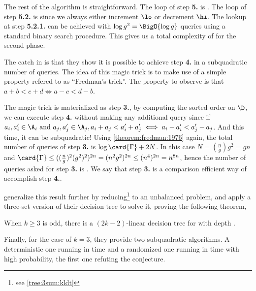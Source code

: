 The rest of the algorithm is straightforward. The loop of step \textbf{5.} is
. The loop of step \textbf{5.2.} is  since we
always either increment $\lo$ or decrement $\hi$. The lookup at step
\textbf{5.2.1.} can be achieved with $\log g^2 = \BigO{\log g}$ queries using
a standard binary search procedure. This gives us a total complexity of
 for the second phase.

The catch in \cite{gronlund:2014} is that they show it is possible to
achieve step \textbf{4.} in a subquadratic number of queries. The idea of this
magic trick is to make use of a simple property refered to as ``Fredman's
trick''. The property to observe is that $a + b < c + d \iff a - c < d - b$.

The magic trick is materialized as step \textbf{3.}, by computing the sorted
order on $\D$, we can execute step \textbf{4.} without making any additional
query since if $a_i, a_i' \in \A_i \text{ and } a_j, a_j' \in \A_j, a_i + a_j <
a_i' + a_j' \iff a_i - a_i' < a_j' - a_j$. And this time, it can be
subquadratic! Using \ref{theorem:fredman:1976} again, the total number of
queries of step \textbf{3.} is $\log \card{\Gamma} + 2N$. In this case $N =
(\frac{n}{g}) g^2 = gn$ and $\card{\Gamma} \le ((\frac{n}{g})^2 (g^2)^2)^{2n} =
(n^2 g^2)^{2n} \le (n^4)^{2n} = n^{8n}$, hence the number of queries asked for
step \textbf{3.} is . We say that step \textbf{3.} is a
comparison efficient way of accomplish step \textbf{4.}.

\citet*{gronlund:2014} generalize this result further by reducing\footnote{see
\ref{tree:3sum:kldt}} \kLDT to an unbalanced \threeSUM problem, and apply a
three-set version of their decision tree to solve it, proving the following
theorem,

\begin{theorem}
When $k \ge 3$ is odd, there is a $(2k-2)$-linear decision tree for \kLDT with
depth .
\end{theorem}

Finally, for the case of $k = 3$, they provide two subquadratic \threeSUM
algorithms. A deterministic one running in  time and a randomized one running in  time with high probability, the first one refuting the \threeSUM
conjecture.
